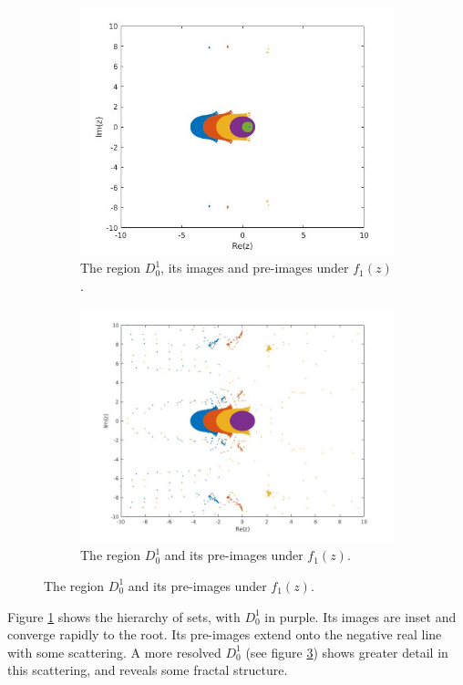 \documentclass{book}
\begin{document}
\begin{figure}
	\begin{subfigure}{0.5\textwidth}
		\includegraphics[width=\textwidth]{FPI_02.jpg}
		\caption{The region $D_0^1$, its images and pre-images under $f_1(z)$.}
		\label{fig:fpi02}
	\end{subfigure}
	\begin{subfigure}{0.5\textwidth}
		\includegraphics[width=\textwidth]{FPI_03.jpg}
		\caption{The region $D_0^1$ and its pre-images under $f_1(z)$.}
		\label{fig:fpi03}
	\end{subfigure}
\end{figure}

Figure \ref{fig:fpi02} shows the hierarchy of sets, with $D_0^1$ in purple.
Its images are inset and converge rapidly to the root.
Its pre-images extend onto the negative real line with some scattering.
A more resolved $D_0^1$ (see figure \ref{fig:fpi03}) shows greater detail in this scattering, and reveals some fractal structure.
\end{document}
